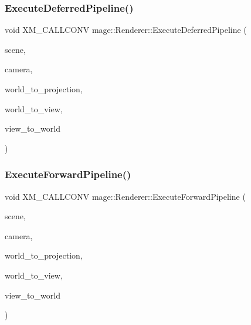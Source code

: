 \subsubsection{\texorpdfstring{Execute\+Deferred\+Pipeline()}{ExecuteDeferredPipeline()}}
{\footnotesize\ttfamily void X\+M\+\_\+\+C\+A\+L\+L\+C\+O\+NV mage\+::\+Renderer\+::\+Execute\+Deferred\+Pipeline (\begin{DoxyParamCaption}\item[{const \hyperlink{classmage_1_1_scene}{Scene} \&}]{scene,  }\item[{const \hyperlink{classmage_1_1_camera}{Camera} \&}]{camera,  }\item[{F\+X\+M\+M\+A\+T\+R\+IX}]{world\+\_\+to\+\_\+projection,  }\item[{C\+X\+M\+M\+A\+T\+R\+IX}]{world\+\_\+to\+\_\+view,  }\item[{C\+X\+M\+M\+A\+T\+R\+IX}]{view\+\_\+to\+\_\+world }\end{DoxyParamCaption})\hspace{0.3cm}{\ttfamily [private]}}

\hypertarget{classmage_1_1_renderer_afd977cdfa89847cc0529e0b793af9988}{}\label{classmage_1_1_renderer_afd977cdfa89847cc0529e0b793af9988} 
\subsubsection{\texorpdfstring{Execute\+Forward\+Pipeline()}{ExecuteForwardPipeline()}}
{\footnotesize\ttfamily void X\+M\+\_\+\+C\+A\+L\+L\+C\+O\+NV mage\+::\+Renderer\+::\+Execute\+Forward\+Pipeline (\begin{DoxyParamCaption}\item[{const \hyperlink{classmage_1_1_scene}{Scene} \&}]{scene,  }\item[{const \hyperlink{classmage_1_1_camera}{Camera} \&}]{camera,  }\item[{F\+X\+M\+M\+A\+T\+R\+IX}]{world\+\_\+to\+\_\+projection,  }\item[{C\+X\+M\+M\+A\+T\+R\+IX}]{world\+\_\+to\+\_\+view,  }\item[{C\+X\+M\+M\+A\+T\+R\+IX}]{view\+\_\+to\+\_\+world }\end{DoxyParamCaption})\hspace{0.3cm}{\ttfamily [private]}}

